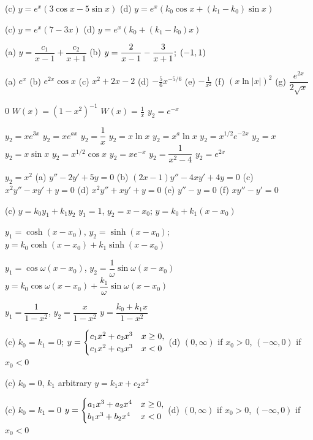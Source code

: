 (c) $y=e^x(3\cos x-5\sin x)$
(d) $y=e^x\left(k_0\cos x+(k_1-k_0)\sin x\right)$

(c) $y=e^x(7-3x)$
(d) $y=e^x\left(k_0+(k_1-k_0)x\right)$

(a) $y=\dfrac{c_1}{x-1}+\dfrac{c_2}{x+1}$
(b) $y=\displaystyle{\frac{2}{x-1}-\frac{3}{x+1}};\; (-1,1)$

(a) $e^x$
 (b) $e^{2x}\cos x$
(c) $x^2+2x-2$
 (d) $\displaystyle{-\frac{5}{6}x^{-5/6}}$
(e) $\displaystyle{-\frac{1}{x^2}}$
 (f) $(x\ln|x|)^2$
(g) $\dfrac{e^{2x}}{2\sqrt x}$

   $0$
 $W(x)=(1-x^2)^{-1}$
$\displaystyle{W(x)=\frac{1}{x}}$
 $y_2=e^{-x}$


 $y_2=xe^{3x}$
 $y_2=xe^{ax}$
 $y_2=\dfrac{1}{x}$
 $y_2=x\ln x$
 $y_2=x^a\ln x$
 $y_2=x^{1/2}e^{-2x}$
 $y_2=x$
 $y_2=x\sin x$
 $y_2=x^{1/2}\cos x$
 $y_2=xe^{-x}$
 $y_2=\dfrac{1}{x^2-4}$
 $y_2=e^{2x}$

 $y_2=x^2$
(a) $y''-2y'+5y=0$
 (b) $(2x-1)y''-4xy'+4y=0$
(c) $x^2y''-xy'+y=0$
(d) $x^2y''+xy'+y=0$
(e) $y''-y=0$
 (f) $xy''-y'=0$

(c) $y=k_0y_1+k_1y_2$
 $y_1=1$,  $y_2=x-x_0$;    $y=k_0+k_1(x-x_0)$

$y_1=\cosh(x-x_0)$,
$y_2=\sinh(x-x_0)$;
 $y=k_0\cosh(x-x_0)+k_1\sinh(x-x_0)$

$y_1=\cos\omega(x-x_0)$,
$y_2=\dfrac{1}{\omega}\sin\omega(x-x_0)$
 $y=k_0\cos\omega(x-x_0)+\dfrac{k_1}{\omega}\sin\omega(x-x_0)$

$y_1=\dfrac{1}{1-x^2}$,\; $y_2=\dfrac{x}{1-x^2}$
$y=\dfrac{k_0+k_1x}{1-x^2}$

(c)  $k_0=k_1=0$;
$y=\displaystyle{\begin{cases}
c_1x^2+c_2x^3&x\ge 0,\\
c_1x^2+c_3x^3&x<0
\end{cases}}$
(d)  $(0,\infty)$ if $x_0>0$, $(-\infty,0)$ if $x_0<0$

(c)  $k_0=0$, $k_1$ arbitrary\; $y=k_1x+c_2x^2$

(c)  $k_0=k_1=0$
$y=\displaystyle{\begin{cases}
a_1x^3+a_2x^4&x\ge 0,\\
b_1x^3+b_2x^4&x<0
\end{cases}}$\;
(d)  $(0,\infty)$ if $x_0>0$, $(-\infty,0)$ if $x_0<0$


